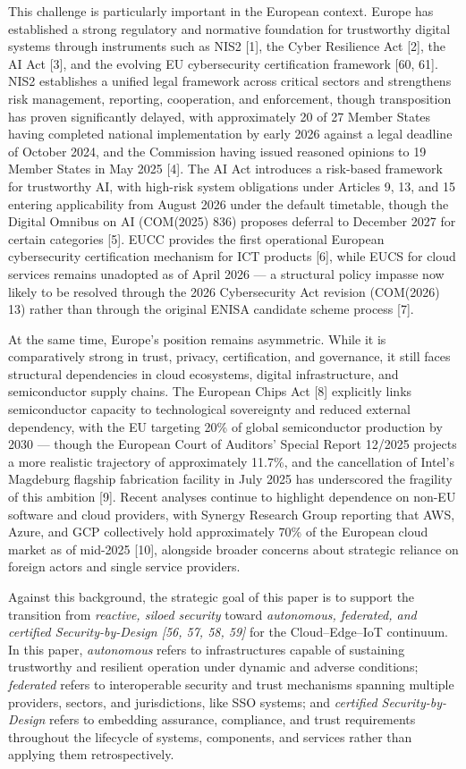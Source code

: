 \documentclass{ieeeaccess}
\begin{document}
This challenge is particularly important in the European context. Europe
has established a strong regulatory and normative foundation for
trustworthy digital systems through instruments such as NIS2 {[}1{]},
the Cyber Resilience Act {[}2{]}, the AI Act {[}3{]}, and the evolving
EU cybersecurity certification framework {[}60, 61{]}. NIS2 establishes
a unified legal framework across critical sectors and strengthens risk
management, reporting, cooperation, and enforcement, though
transposition has proven significantly delayed, with approximately 20 of
27 Member States having completed national implementation by early 2026
against a legal deadline of October 2024, and the Commission having
issued reasoned opinions to 19 Member States in May 2025 {[}4{]}. The AI
Act introduces a risk-based framework for trustworthy AI, with high-risk
system obligations under Articles 9, 13, and 15 entering applicability
from August 2026 under the default timetable, though the Digital Omnibus
on AI (COM(2025) 836) proposes deferral to December 2027 for certain
categories {[}5{]}. EUCC provides the first operational European
cybersecurity certification mechanism for ICT products {[}6{]}, while
EUCS for cloud services remains unadopted as of April 2026 --- a
structural policy impasse now likely to be resolved through the 2026
Cybersecurity Act revision (COM(2026) 13) rather than through the
original ENISA candidate scheme process {[}7{]}.

At the same time, Europe's position remains asymmetric. While it is
comparatively strong in trust, privacy, certification, and governance,
it still faces structural dependencies in cloud ecosystems, digital
infrastructure, and semiconductor supply chains. The European Chips Act
{[}8{]} explicitly links semiconductor capacity to technological
sovereignty and reduced external dependency, with the EU targeting 20\%
of global semiconductor production by 2030 --- though the European
Court of Auditors' Special Report 12/2025 projects a more realistic
trajectory of approximately 11.7\%, and the cancellation of Intel's
Magdeburg flagship fabrication facility in July 2025 has underscored the
fragility of this ambition {[}9{]}. Recent analyses continue to
highlight dependence on non-EU software and cloud providers, with
Synergy Research Group reporting that AWS, Azure, and GCP collectively
hold approximately 70\% of the European cloud market as of mid-2025
{[}10{]}, alongside broader concerns about strategic reliance on foreign
actors and single service providers.

Against this background, the strategic goal of this paper is to support
the transition from \emph{reactive, siloed security} toward
\emph{autonomous, federated, and certified Security-by-Design {[}56, 57,
58, 59{]}} for the Cloud--Edge--IoT continuum. In this paper,
\emph{autonomous} refers to infrastructures capable of sustaining
trustworthy and resilient operation under dynamic and adverse
conditions; \emph{federated} refers to interoperable security and trust
mechanisms spanning multiple providers, sectors, and jurisdictions,
like SSO systems; and \emph{certified Security-by-Design} refers to
embedding assurance, compliance, and trust requirements throughout the
lifecycle of systems, components, and services rather than applying them
retrospectively.
\end{document}
